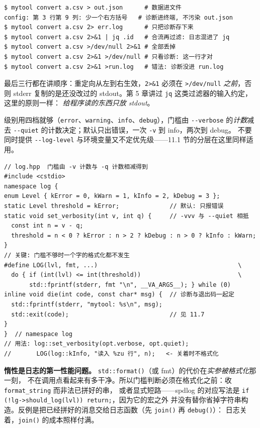 \documentclass[12pt,a4paper,fontset=fandol]{ctexbook}
\newcommand{\Fn}[1]{\texttt{#1()}}
\newcommand{\Tp}[1]{\texttt{#1}}
\newcommand{\Opt}[1]{\texttt{-\/-#1}}
\newcommand{\Short}[1]{\texttt{-#1}}
\begin{document}
\begin{lstlisting}[style=shellstyle,caption={stdout 与 stderr 的分工与合流}]
$ mytool convert a.csv > out.json      # 数据进文件
config: 第 3 行第 9 列: 少一个右方括号   # 诊断进终端, 不污染 out.json
$ mytool convert a.csv 2> err.log      # 只把诊断存下来
$ mytool convert a.csv 2>&1 | jq .id   # 合流再过滤: 日志混进了 jq
$ mytool convert a.csv >/dev/null 2>&1 # 全部丢掉
$ mytool convert a.csv 2>&1 >/dev/null # 只看诊断: 这一行才对
$ mytool convert a.csv 2>&1 >run.log   # 错法: 诊断没进 run.log
\end{lstlisting}

最后三行都在讲顺序：重定向从左到右生效，\Tp{2>\&1} 必须在 \Tp{>/dev/null} \emph{之前}，否则
stderr 复制的是还没改过的 stdout。第 5 章讲过 \Tp{jq} 这类过滤器的输入约定，这里的原则一样：
\emph{给程序读的东西只放 stdout}。

级别用四档就够（\Tp{error}、\Tp{warning}、\Tp{info}、\Tp{debug}），门槛由 \Opt{verbose}
的\emph{计数}减去 \Opt{quiet} 的计数决定；默认只出错误，一次 \Short{v} 到 info，两次到 debug。
不要同时提供 \Opt{log-level} 与环境变量又不定优先级——11.1 节的分层在这里同样适用。

\begin{lstlisting}[caption={只写 stderr 的四级日志与 verbose 计数开关（log.hpp）}]
// log.hpp  门槛由 -v 计数与 -q 计数相减得到
#include <cstdio>
namespace log {
enum Level { kError = 0, kWarn = 1, kInfo = 2, kDebug = 3 };
static Level threshold = kError;              // 默认: 只报错误
static void set_verbosity(int v, int q) {     // -vvv 与 --quiet 相抵
  const int n = v - q;
  threshold = n < 0 ? kError : n > 2 ? kDebug : n > 0 ? kInfo : kWarn;
}
// 关键: 门槛不够时一个字的格式化都不发生
#define LOG(lvl, fmt, ...)                                       \
  do { if (int(lvl) <= int(threshold))                           \
       std::fprintf(stderr, fmt "\n", __VA_ARGS__); } while (0)
inline void die(int code, const char* msg) {  // 诊断与退出码一起定
  std::fprintf(stderr, "mytool: %s\n", msg);
  std::exit(code);                            // 见 11.7
}
}  // namespace log
// 用法: log::set_verbosity(opt.verbose, opt.quiet);
//       LOG(log::kInfo, "读入 %zu 行", n);   <- 关着时不格式化
\end{lstlisting}

\textbf{惰性是日志的第一性能问题。} \Fn{std::format}（或 fmt）的代价在\emph{实参被格式化}那一刻，
不在调用点看起来有多干净。所以门槛判断必须在格式化之前：收 \Tp{format\_string} 而非法已拼好的串，
或者显式短路——spdlog 的对应写法是 \Tp{if (!lg->should\_log(lvl)) return;}，因为它的宏之外
并没有替你省掉字符串构造。反例是把已经拼好的消息交给日志函数（先 \Fn{join} 再 \Fn{debug}）：
日志关着，\Fn{join} 的成本照样付满。
\end{document}
